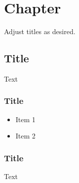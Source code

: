 \section{Chapter}
Adjust titles as desired. 

\subsection{Title}
Text

\subsubsection{Title}

\begin{itemize}
    \item Item 1
    \item Item 2
\end{itemize}

\subsubsection{Title}

Text